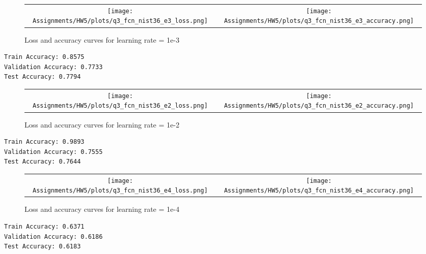 \documentclass[a4paper]{article}
\begin{document}
\begin{figure}[!ht]
\centering
\begin{tabular}{cc}
{\texttt{[image: Assignments/HW5/plots/q3\_fcn\_nist36\_e3\_loss.png]}} &
{\texttt{[image: Assignments/HW5/plots/q3\_fcn\_nist36\_e3\_accuracy.png]}}
\end{tabular}
\caption{Loss and accuracy curves for learning rate = 1e-3}
\end{figure}

\begin{center}
\begin{BVerbatim}
Train Accuracy: 0.8575
Validation Accuracy: 0.7733
Test Accuracy: 0.7794
\end{BVerbatim}
\end{center}
\bigskip

\begin{figure}[!ht]
\centering
\begin{tabular}{cc}
{\texttt{[image: Assignments/HW5/plots/q3\_fcn\_nist36\_e2\_loss.png]}} &
{\texttt{[image: Assignments/HW5/plots/q3\_fcn\_nist36\_e2\_accuracy.png]}}
\end{tabular}
\caption{Loss and accuracy curves for learning rate = 1e-2}
\end{figure}

\begin{center}
\begin{BVerbatim}
Train Accuracy: 0.9893
Validation Accuracy: 0.7555
Test Accuracy: 0.7644
\end{BVerbatim}
\end{center}
\clearpage

\begin{figure}[!ht]
\centering
\begin{tabular}{cc}
{\texttt{[image: Assignments/HW5/plots/q3\_fcn\_nist36\_e4\_loss.png]}} &
{\texttt{[image: Assignments/HW5/plots/q3\_fcn\_nist36\_e4\_accuracy.png]}}
\end{tabular}
\caption{Loss and accuracy curves for learning rate = 1e-4}
\end{figure}

\begin{center}
\begin{BVerbatim}
Train Accuracy: 0.6371
Validation Accuracy: 0.6186
Test Accuracy: 0.6183
\end{BVerbatim}
\end{center}
\end{document}
